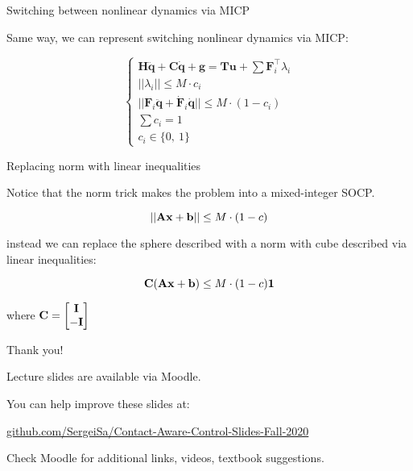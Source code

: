 \documentclass{beamer}
\begin{document}
\begin{frame}{Switching between nonlinear dynamics via MICP}
\begin{flushleft}

Same way, we can represent switching nonlinear dynamics via MICP:

\begin{equation}
    \begin{cases}
    \mathbf{H}\ddot{\mathbf{q}} + \mathbf{C}\dot{\mathbf{q}} + \mathbf{g} = \mathbf{T}\mathbf{u} + \sum \mathbf{F}_i^\top \lambda_i \\
    || \lambda_i || \leq 
    M \cdot c_i \\
    || \mathbf{F}_i \ddot{\mathbf{q}} + \dot{\mathbf{F}}_i \dot{\mathbf{q}} || \leq 
    M \cdot (1 - c_i) \\
    \sum c_i = 1 \\
    c_i  \in \{0, \ 1 \}
    \end{cases}
\end{equation}


\end{flushleft}
\end{frame}



\begin{frame}{Replacing norm with linear inequalities}
\begin{flushleft}

Notice that the norm trick makes the problem into a mixed-integer SOCP.

\begin{equation}
    || \mathbf{A} \mathbf{x} + \mathbf{b}  || \leq 
    M \cdot (1 - c)
\end{equation}

instead we can replace the sphere described with a norm with cube described via linear inequalities:

\begin{equation}
    \mathbf{C} (\mathbf{A} \mathbf{x} + \mathbf{b}) \leq 
    M \cdot (1 - c) \mathbf{1}
\end{equation}

where $\mathbf{C} = \begin{bmatrix} \mathbf{I} \\ -\mathbf{I} \end{bmatrix}$

\end{flushleft}
\end{frame}





\begin{frame}{Thank you!}
\centerline{Lecture slides are available via Moodle.}
\bigskip
\centerline{You can help improve these slides at:}
\centerline{\href{https://github.com/SergeiSa/Contact-Aware-Control-Slides-Fall-2020}{github.com/SergeiSa/Contact-Aware-Control-Slides-Fall-2020}}
\bigskip
\centerline{Check Moodle for additional links, videos, textbook suggestions.}
\end{frame}
\end{document}
